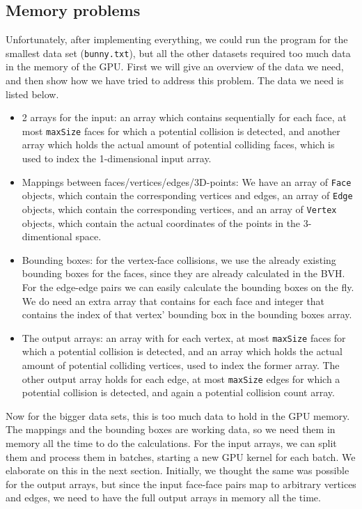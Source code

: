 \subsection{Memory problems}
\label{subsec:memory}
Unfortunately, after implementing everything, we could run the program for the smallest data set (\texttt{bunny.txt}), but all the other datasets required too much data in the memory of the GPU. First we will give an overview of the data we need, and then show how we have tried to address this problem. The data we need is listed below.

\begin{itemize}
	\item 2 arrays for the input: an array which contains sequentially for each face, at most \texttt{maxSize} faces for which a potential collision is detected, and another array which holds the actual amount of potential colliding faces, which is used to index the 1-dimensional input array.
	\item Mappings between faces/vertices/edges/3D-points: We have an array of \texttt{Face} objects, which contain the corresponding vertices and edges, an array of \texttt{Edge} objects, which contain the corresponding vertices, and an array of \texttt{Vertex} objects, which contain the actual coordinates of the points in the 3-dimentional space.
	\item Bounding boxes: for the vertex-face collisions, we use the already existing bounding boxes for the faces, since they are already calculated in the BVH. For the edge-edge pairs we can easily calculate the bounding boxes on the fly. We do need an extra array that contains for each face and integer that contains the index of that vertex' bounding box in the bounding boxes array.
	\item The output arrays: an array with for each vertex, at most \texttt{maxSize} faces for which a potential collision is detected, and an array which holds the actual amount of potential colliding vertices, used to index the former array. The other output array holds for each edge, at most \texttt{maxSize} edges for which a potential collision is detected, and again a potential collision count array.
\end{itemize}

Now for the bigger data sets, this is too much data to hold in the GPU memory. The mappings and the bounding boxes are working data, so we need them in memory all the time to do the calculations. For the input arrays, we can split them and process them in batches, starting a new GPU kernel for each batch. We elaborate on this in the next section. Initially, we thought the same was possible for the output arrays, but since the input face-face pairs map to arbitrary vertices and edges, we need to have the full output arrays in memory all the time.\\

